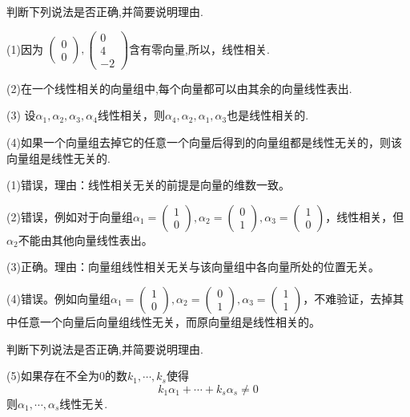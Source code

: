 \documentclass[a4paper]{report}
\begin{document}
\EX 判断下列说法是否正确,并简要说明理由.

(1)因为
$
\begin{pmatrix}
0\\ 0
\end{pmatrix},\begin{pmatrix}
               0\\ 4\\ -2
              \end{pmatrix}
$含有零向量,所以，线性相关.

(2)在一个线性相关的向量组中,每个向量都可以由其余的向量线性表出.

(3) 设$\alpha_1,\alpha_2,\alpha_3,\alpha_4$线性相关，则$\alpha_4,\alpha_2,\alpha_1,\alpha_3$也是线性相关的.

(4)如果一个向量组去掉它的任意一个向量后得到的向量组都是线性无关的，则该向量组是线性无关的.
\begin{jie}
(1)错误，理由：线性相关无关的前提是向量的维数一致。

(2)错误，例如对于向量组$\alpha_1=
\begin{pmatrix}
1\\ 0
\end{pmatrix}
,\alpha_2=
\begin{pmatrix}
0\\ 1
\end{pmatrix},\alpha_3=
\begin{pmatrix}
1\\ 0
\end{pmatrix}$，线性相关，但$\alpha_2$不能由其他向量线性表出。

(3)正确。理由：向量组线性相关无关与该向量组中各向量所处的位置无关。

(4)错误。例如向量组$\alpha_1=
\begin{pmatrix}
1\\ 0
\end{pmatrix}
,\alpha_2=
\begin{pmatrix}
0\\ 1
\end{pmatrix},\alpha_3=
\begin{pmatrix}
1\\ 1
\end{pmatrix}$，不难验证，去掉其中任意一个向量后向量组线性无关，而原向量组是线性相关的。
\end{jie}

\EX 判断下列说法是否正确,并简要说明理由.

(5)如果存在不全为$0$的数$k_1,\cdots,k_s$使得
\begin{equation*}
  k_1\alpha_1+\cdots+k_s\alpha_s\neq0
\end{equation*}
则$\alpha_1,\cdots,\alpha_s$线性无关.
\end{document}
